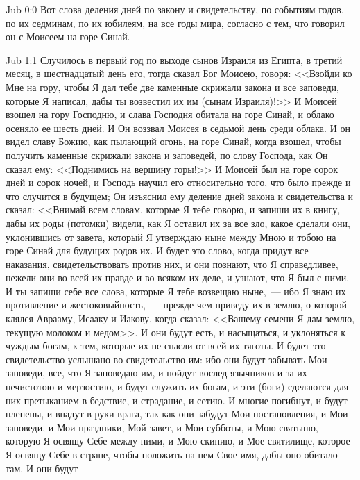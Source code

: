 \vs Jub 0:0
Вот слова деления дней по закону и свидетельству,
по событиям годов,
по их седминам, по их юбилеям, на все годы мира,
согласно с тем, что говорил он с Моисеем на горе Синай.

\vs Jub 1:1
Случилось в первый год по выходе сынов Израиля из Египта, в третий месяц, в
шестнадцатый день его, тогда сказал Бог Моисею, говоря: <<Взойди ко Мне на
гору, чтобы Я дал тебе две каменные скрижали закона и все заповеди, которые Я
написал, дабы ты возвестил их им (сынам Израиля)!>> И Моисей взошел на гору
Господню, и слава Господня обитала на горе Синай, и облако осеняло ее шесть
дней. И Он воззвал Моисея в седьмой день среди облака. И он видел славу Божию,
как пылающий огонь, на горе Синай, когда взошел, чтобы получить каменные
скрижали закона и заповедей, по слову Господа, как Он сказал ему:
<<Поднимись на вершину горы!>> И Моисей был на горе сорок дней и сорок
ночей, и Господь научил его относительно того, что было прежде и что случится в
будущем; Он изъяснил ему деление дней закона и свидетельства и сказал:
<<Внимай всем словам, которые Я тебе говорю, и запиши их в книгу, дабы их
роды (потомки) видели, как Я оставил их за все зло, какое сделали они,
уклонившись от завета, который Я утверждаю ныне между Мною и тобою на горе
Синай для будущих родов их. И будет это слово, когда придут все наказания,
свидетельствовать против них, и они познают, что Я справедливее, нежели они во
всей их правде и во всяком их деле, и узнают, что Я был с ними. И ты запиши
себе все слова, которые Я тебе возвещаю ныне,~--- ибо Я знаю их противление
и жестоковыйность,~--- прежде чем приведу их в землю, о которой клялся
Аврааму, Исааку и Иакову, когда сказал: <<Вашему семени Я дам землю,
текущую молоком и медом>>. И они будут есть, и насыщаться, и уклоняться к
чуждым богам, к тем, которые их не спасли от всей их тяготы. И будет это
свидетельство услышано во свидетельство им: ибо они будут забывать Мои
заповеди, все, что Я заповедаю им, и пойдут вослед язычников и за их нечистотою
и мерзостию, и будут служить их богам, и эти (боги) сделаются для них
претыканием в бедствие, и страдание, и сетию. И многие погибнут, и будут
пленены, и впадут в руки врага, так как они забудут Мои постановления, и Мои
заповеди, и Мои праздники, Мой завет, и Мои субботы, и Мою святыню, которую Я
освящу Себе между ними, и Мою скинию, и Мое святилище, которое Я освящу Себе в
стране, чтобы положить на нем Свое имя, дабы оно обитало там. И они будут
